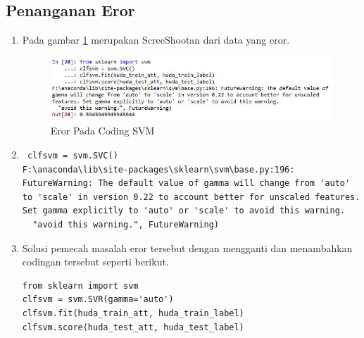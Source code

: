 \subsection{Penanganan Eror}
\begin{enumerate}
\item Pada gambar \ref{c4_16} merupakan ScreeShootan dari data yang eror.
\begin{figure}[!htbp]
	\centerline{\includegraphics[width=1\textwidth]{figures/huda/chapter4/eror.JPG}}
	\caption{Eror Pada Coding SVM}
	\label{c4_16}
\end{figure}
\item 
\begin{verbatim}
 clfsvm = svm.SVC()
F:\anaconda\lib\site-packages\sklearn\svm\base.py:196: FutureWarning: The default value of gamma will change from 'auto' to 'scale' in version 0.22 to account better for unscaled features. Set gamma explicitly to 'auto' or 'scale' to avoid this warning.
  "avoid this warning.", FutureWarning)
\end{verbatim}
\item Solusi pemecah masalah eror tersebut dengan mengganti dan menambahkan codingan tersebut seperti berikut.
\begin{verbatim}
from sklearn import svm
clfsvm = svm.SVR(gamma='auto')
clfsvm.fit(huda_train_att, huda_train_label)
clfsvm.score(huda_test_att, huda_test_label)
\end{verbatim}
\end{enumerate}
